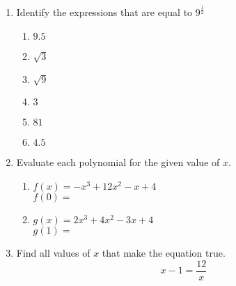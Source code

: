 \documentclass[12pt, twoside]{article}
\begin{document}
\begin{enumerate}
\item Identify the expressions that are equal to $\displaystyle 9^{\frac{1}{2}}$
  \begin{multicols}{2}
  \begin{enumerate}
      \item $9.5$
      \item $\sqrt{3}$
      \item $\sqrt{9}$
      \item $3$
      \item $81$
      \item $4.5$
  \end{enumerate}
  \end{multicols}

\item Evaluate each polynomial for the given value of $x$.
  \begin{multicols}{2}
      \begin{enumerate}[itemsep=1cm]
          \item $f(x)=-x^3+12x^2-x+4$ \\[0.25cm] 
          $f(0) = $
          \item $g(x)=2x^3+4x^2-3x+4$ \\[0.25cm] 
          $g(1) = $
      \end{enumerate}
      \end{multicols} \vspace{1cm}

\item Find all values of $x$ that make the equation true.
    $$x-1=\frac{12}{x}$$ \vspace{4cm}

\end{enumerate}
\end{document}
